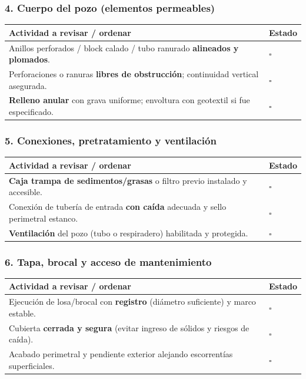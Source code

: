 \documentclass[12pt]{article}
\newcommand{\cbox}{\(\square\)}
\renewcommand{\cbox}{\(\square\)} %
\begin{document}
	\subsubsection*{4. Cuerpo del pozo (elementos permeables)}
	\begin{tabularx}{\linewidth}{>{\raggedright\arraybackslash}p{0.93\linewidth} >{\centering\arraybackslash}m{0.07\linewidth}}
		\toprule
		\textbf{Actividad a revisar / ordenar} & \textbf{Estado}\\
		\midrule
		Anillos perforados / block calado / tubo ranurado \textbf{alineados y plomados}. & \cbox \\
		Perforaciones o ranuras \textbf{libres de obstrucción}; continuidad vertical asegurada. & \cbox \\
		\textbf{Relleno anular} con grava uniforme; envoltura con geotextil si fue especificado. & \cbox \\
		\bottomrule
	\end{tabularx}
	
	\subsubsection*{5. Conexiones, pretratamiento y ventilación}
	\begin{tabularx}{\linewidth}{>{\raggedright\arraybackslash}p{0.93\linewidth} >{\centering\arraybackslash}m{0.07\linewidth}}
		\toprule
		\textbf{Actividad a revisar / ordenar} & \textbf{Estado}\\
		\midrule
		\textbf{Caja trampa de sedimentos/grasas} o filtro previo instalado y accesible. & \cbox \\
		Conexión de tubería de entrada \textbf{con caída} adecuada y sello perimetral estanco. & \cbox \\
		\textbf{Ventilación} del pozo (tubo o respiradero) habilitada y protegida. & \cbox \\
		\bottomrule
	\end{tabularx}
	
	\subsubsection*{6. Tapa, brocal y acceso de mantenimiento}
	\begin{tabularx}{\linewidth}{>{\raggedright\arraybackslash}p{0.93\linewidth} >{\centering\arraybackslash}m{0.07\linewidth}}
		\toprule
		\textbf{Actividad a revisar / ordenar} & \textbf{Estado}\\
		\midrule
		Ejecución de losa/brocal con \textbf{registro} (diámetro suficiente) y marco estable. & \cbox \\
		Cubierta \textbf{cerrada y segura} (evitar ingreso de sólidos y riesgos de caída). & \cbox \\
		Acabado perimetral y pendiente exterior alejando escorrentías superficiales. & \cbox \\
		\bottomrule
	\end{tabularx}
	
\end{document}
